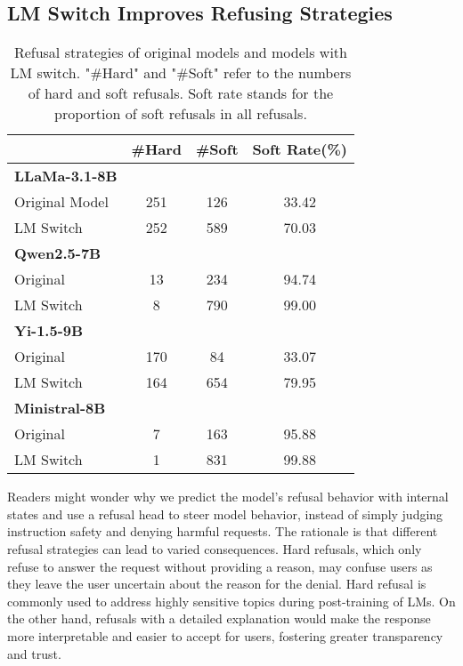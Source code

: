 

\subsection{LM Switch Improves Refusing Strategies}

\begin{table}[]
\caption{Refusal strategies of original models and models with LM switch. "\#Hard" and "\#Soft" refer to the numbers of hard and soft refusals. Soft rate stands for the proportion of soft refusals in all refusals.}\label{table:refusal}
\vspace{2mm}
\centering
\renewcommand{\arraystretch}{1.1}
\begin{tabular}{lccc}
\hline
                      & \#Hard & \#Soft & Soft Rate(\%) \\\hline\hline
\textbf{LLaMa-3.1-8B} &              &              &           \\
Original Model        & 251            & 126            &   33.42        \\
LM Switch            & 252            & 589            &   70.03        \\\hline
\textbf{Qwen2.5-7B}   &              &              &           \\
Original       & 13            & 234            &    94.74       \\
LM Switch            & 8           & 790            & 99.00 \\\hline
\textbf{Yi-1.5-9B}    &              &              &           \\
Original        & 170            & 84            &   33.07        \\
LM Switch            & 164            & 654            &   79.95        \\\hline
\textbf{Ministral-8B} &              &              &           \\
Original       & 7            & 163           &    95.88       \\
LM Switch            & 1            & 831            &    99.88     \\\hline 
\end{tabular}
\end{table}

Readers might wonder why we predict the model's refusal behavior with internal states and use a refusal head to steer model behavior, instead of simply judging instruction safety and denying harmful requests. The rationale is that different refusal strategies can lead to varied consequences. Hard refusals, which only refuse to answer the request without providing a reason, may confuse users as they leave the user uncertain about the reason for the denial. Hard refusal is commonly used to address highly sensitive topics during post-training of LMs. On the other hand, refusals with a detailed explanation would make the response more interpretable and easier to accept for users, fostering greater transparency and trust.

